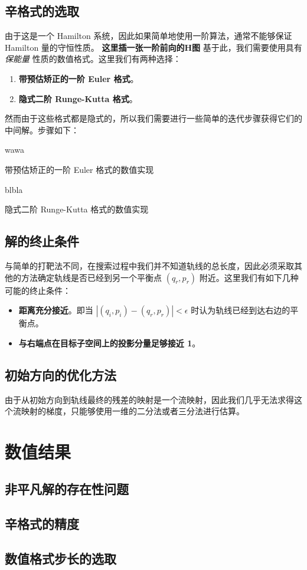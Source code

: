 \documentclass[]{article}
\begin{document}
\subsection{辛格式的选取}
由于这是一个 Hamilton 系统，因此如果简单地使用一阶算法，通常不能够保证 Hamilton 量的守恒性质。
\textbf{这里插一张一阶前向的H图}
基于此，我们需要使用具有 \emph{保能量} 性质的数值格式。这里我们有两种选择：
\begin{enumerate}
	\item \textbf{带预估矫正的一阶 Euler 格式}。
	\item \textbf{隐式二阶 Runge-Kutta 格式}。
\end{enumerate}
然而由于这些格式都是隐式的，所以我们需要进行一些简单的迭代步骤获得它们的中间解。步骤如下：

\begin{algorithm}[H]
	wawa
	\caption{带预估矫正的一阶 Euler 格式的数值实现}
\end{algorithm}
\begin{algorithm}[H]
	blbla
	\caption{隐式二阶 Runge-Kutta 格式的数值实现}
\end{algorithm}
\subsection{解的终止条件}
与简单的打靶法不同，在搜索过程中我们并不知道轨线的总长度，因此必须采取其他的方法确定轨线是否已经到另一个平衡点 $(q_r, p_r)$ 附近。这里我们有如下几种可能的终止条件：
\begin{itemize}
	\item \textbf{距离充分接近}。即当 $|(q_i, p_i) - (q_r, p_r)| < \epsilon$ 时认为轨线已经到达右边的平衡点。
	\item \textbf{与右端点在目标子空间上的投影分量足够接近 1}。
\end{itemize}
\subsection{初始方向的优化方法}
由于从初始方向到轨线最终的残差的映射是一个流映射，因此我们几乎无法求得这个流映射的梯度，只能够使用一维的二分法或者三分法进行估算。

\section{数值结果}
\subsection{非平凡解的存在性问题}
\subsection{辛格式的精度}
\subsection{数值格式步长的选取}
\end{document}
